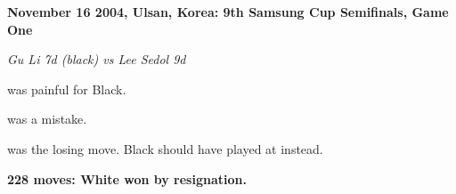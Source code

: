 \documentclass[letterpaper,12pt]{memoir}
\begin{document}
\textbf{November 16 2004, Ulsan, Korea: 9th Samsung Cup Semifinals, Game One}

\textit{Gu Li 7d (black) vs Lee Sedol 9d}

{} was painful for Black.

{} was a mistake.

{} was the losing move. Black should have played {} at {} instead.

\textbf{228 moves: White won by resignation.}


\vfill
\end{document}
